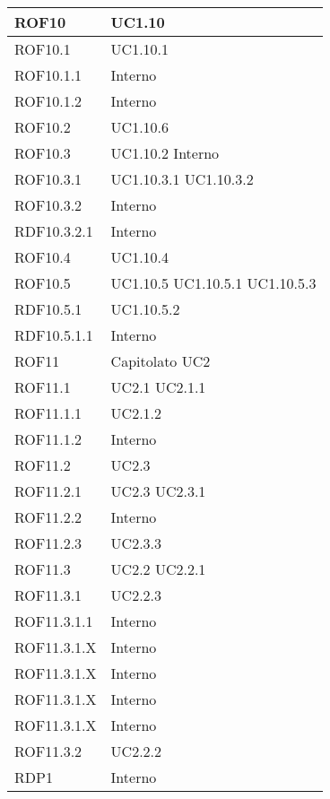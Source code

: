 \begin{center}
\begin{longtable}{| p{4cm} | p{4cm} |}
\hline
ROF10   &  UC1.10 \\
\hline
ROF10.1   &  UC1.10.1 \\
\hline
ROF10.1.1   &  Interno \\
\hline
ROF10.1.2   &  Interno \\
\hline
ROF10.2   &  UC1.10.6 \\
\hline
ROF10.3   &  UC1.10.2 \newline Interno \\
\hline
ROF10.3.1   &  UC1.10.3.1 \newline UC1.10.3.2 \\
\hline
ROF10.3.2   &  Interno \\
\hline
RDF10.3.2.1   &  Interno \\
\hline
ROF10.4   &  UC1.10.4 \\
\hline
ROF10.5   &  UC1.10.5 \newline UC1.10.5.1 \newline UC1.10.5.3 \\
\hline
RDF10.5.1   &  UC1.10.5.2 \\
\hline
RDF10.5.1.1   &  Interno \\
\hline
ROF11   &  Capitolato \newline UC2 \\
\hline
ROF11.1   &  UC2.1 \newline UC2.1.1 \\
\hline
ROF11.1.1   &  UC2.1.2 \\
\hline
ROF11.1.2   &  Interno \\
\hline
ROF11.2   &  UC2.3  \\
\hline
ROF11.2.1   &  UC2.3 \newline UC2.3.1 \\
\hline
ROF11.2.2   &  Interno \\
\hline
ROF11.2.3   &  UC2.3.3 \\
\hline
ROF11.3   &  UC2.2 \newline UC2.2.1 \\
\hline
ROF11.3.1   &  UC2.2.3 \\
\hline
ROF11.3.1.1   &  Interno \\
\hline
ROF11.3.1.X   &  Interno \\
\hline
ROF11.3.1.X   &  Interno \\
\hline
ROF11.3.1.X   &  Interno \\
\hline
ROF11.3.1.X   &  Interno \\
\hline
ROF11.3.2   &  UC2.2.2 \\
\hline
RDP1   &  Interno \\

\end{longtable}
\end{center}
